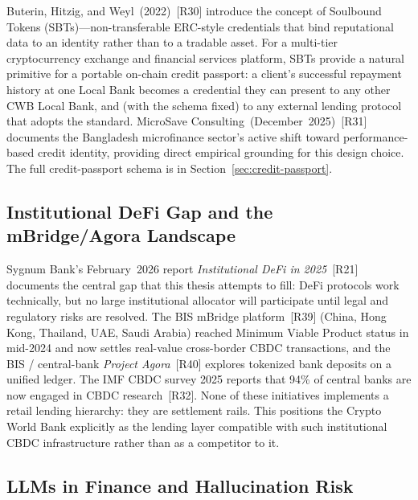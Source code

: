 \documentclass[12pt,a4paper]{report}
\begin{document}
Buterin, Hitzig, and Weyl~(2022)~[R30] introduce the concept of Soulbound Tokens (SBTs)---non-transferable ERC-style credentials that bind reputational data to an identity rather than to a tradable asset. For a multi-tier cryptocurrency exchange and financial services platform, SBTs provide a natural primitive for a portable on-chain credit passport: a client's successful repayment history at one Local Bank becomes a credential they can present to any other CWB Local Bank, and (with the schema fixed) to any external lending protocol that adopts the standard. MicroSave Consulting~(December~2025)~[R31] documents the Bangladesh microfinance sector's active shift toward performance-based credit identity, providing direct empirical grounding for this design choice. The full credit-passport schema is in Section~\ref{sec:credit-passport}.

\subsection{Institutional DeFi Gap and the mBridge/Agora Landscape}
\label{sec:lit-institutional}

Sygnum Bank's February~2026 report \textit{Institutional DeFi in 2025}~[R21] documents the central gap that this thesis attempts to fill: DeFi protocols work technically, but no large institutional allocator will participate until legal and regulatory risks are resolved. The BIS mBridge platform~[R39] (China, Hong Kong, Thailand, UAE, Saudi Arabia) reached Minimum Viable Product status in mid-2024 and now settles real-value cross-border CBDC transactions, and the BIS / central-bank \textit{Project Agora}~[R40] explores tokenized bank deposits on a unified ledger. The IMF CBDC survey 2025 reports that 94\% of central banks are now engaged in CBDC research~[R32]. None of these initiatives implements a retail lending hierarchy: they are settlement rails. This positions the Crypto World Bank explicitly as the lending layer compatible with such institutional CBDC infrastructure rather than as a competitor to it.

\subsection{LLMs in Finance and Hallucination Risk}
\label{sec:lit-llm}
\end{document}
